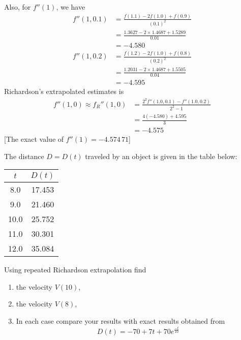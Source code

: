 \documentclass[12pt,class=book,crop=false]{standalone}
\begin{document}
\begin{ex}
    Also, for $ f''(1 ) $, we have
    \begin{align*}
        f''(1,0.1) & =\frac{f(1.1)-2f(1.0)+f(0.9)}{(0.1)^2}     \\
                   & =\frac{1.3627-2\times 1.4687+1.5289}{0.01} \\
                   & =-4.580                                    \\
        f''(1,0.2) & =\frac{f(1.2)-2f(1.0)+f(0.8)}{(0.2)^2}     \\
                   & =\frac{1.2031-2\times 1.4687+1.5505}{0.04} \\
                   & =-4.595
    \end{align*}
    Richardson's extrapolated estimates is
    \begin{align*}
        f''(1,0)\approx f_R''(1,0) & = \frac{2^2 f''(1.0,0.1)-f''(1.0,0.2)}{ 2^2-1} \\
                                   & =\frac{4(-4.580)+4.595}{3}                     \\
                                   & =-4.575
    \end{align*}
    [The exact value of $ f''(1 )=-4.574\,71 $]
\end{ex}
\begin{prob}
    The distance $ D=D(t) $ traveled by an object is given in the table below:
    \begin{table}[H]
        \centering
        \begin{tabular}{S[table-format=2.1]S[table-format=2.3]}
            \toprule
            &  \\    & 17.453 \\
             9.0    & 21.460 \\
             10.0   & 25.752 \\
             11.0   &  30.301 \\
             12.0   & 35.084 \\\bottomrule
        \end{tabular}
    \end{table}

    Using repeated Richardson extrapolation find
    \begin{enumerate}[label=(\alph*)]
        \item the velocity $ V(10) $,
        \item the velocity $ V(8) $,
        \item  In each case compare your results with exact results obtained from
              \[
                  D(t)=-70+7t+70 e^{\frac{-t}{10}}
              \]
    \end{enumerate}
\end{prob}
\end{document}
